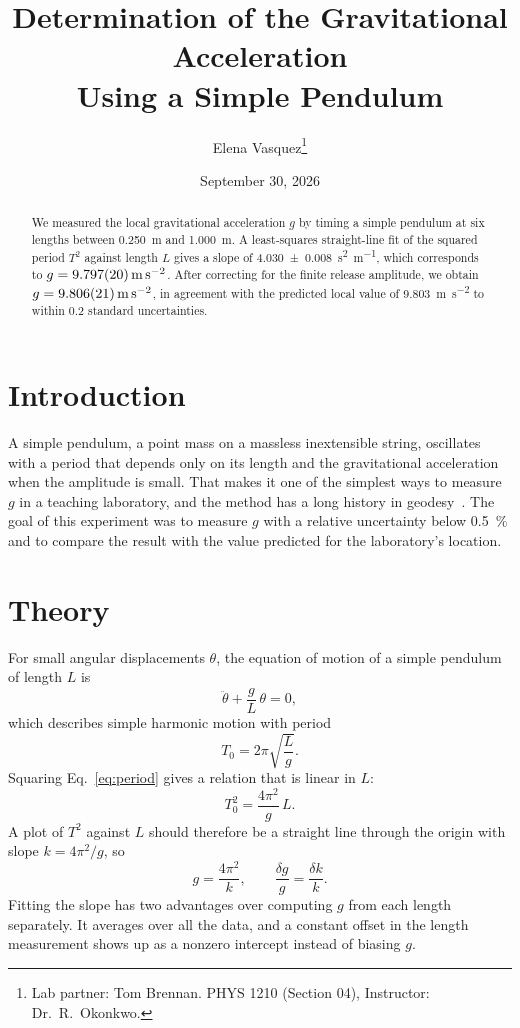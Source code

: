 \documentclass[11pt,a4paper]{article}
\title{Determination of the Gravitational Acceleration\\Using a Simple Pendulum}
\author{Elena Vasquez\thanks{Lab partner: Tom Brennan. PHYS 1210 (Section 04), Instructor: Dr.~R.~Okonkwo.}}
\date{September 30, 2026}
\begin{document}
\maketitle

\begin{abstract}
We measured the local gravitational acceleration $g$ by timing a simple pendulum at six lengths between \SI{0.250}{\meter} and \SI{1.000}{\meter}. A least-squares straight-line fit of the squared period $T^2$ against length $L$ gives a slope of \SI{4.030 \pm 0.008}{\second\squared\per\meter}, which corresponds to $g = \SI{9.797 \pm 0.020}{\meter\per\second\squared}$. After correcting for the finite release amplitude, we obtain $g = \SI{9.806 \pm 0.021}{\meter\per\second\squared}$, in agreement with the predicted local value of \SI{9.803}{\meter\per\second\squared} to within $0.2$ standard uncertainties.
\end{abstract}

\section{Introduction}

A simple pendulum, a point mass on a massless inextensible string, oscillates with a period that depends only on its length and the gravitational acceleration when the amplitude is small. That makes it one of the simplest ways to measure $g$ in a teaching laboratory, and the method has a long history in geodesy~\cite{nelson1986}. The goal of this experiment was to measure $g$ with a relative uncertainty below \SI{0.5}{\percent} and to compare the result with the value predicted for the laboratory's location.

\section{Theory}

For small angular displacements $\theta$, the equation of motion of a simple pendulum of length $L$ is
\begin{equation}
  \ddot{\theta} + \frac{g}{L}\,\theta = 0,
  \label{eq:sho}
\end{equation}
which describes simple harmonic motion with period
\begin{equation}
  T_0 = 2\pi\sqrt{\frac{L}{g}}.
  \label{eq:period}
\end{equation}
Squaring Eq.~\eqref{eq:period} gives a relation that is linear in $L$:
\begin{equation}
  T_0^2 = \frac{4\pi^2}{g}\,L.
  \label{eq:linear}
\end{equation}
A plot of $T^2$ against $L$ should therefore be a straight line through the origin with slope $k = 4\pi^2/g$, so
\begin{equation}
  g = \frac{4\pi^2}{k}, \qquad \frac{\delta g}{g} = \frac{\delta k}{k}.
  \label{eq:g-from-slope}
\end{equation}
Fitting the slope has two advantages over computing $g$ from each length separately. It averages over all the data, and a constant offset in the length measurement shows up as a nonzero intercept instead of biasing $g$.
\end{document}
